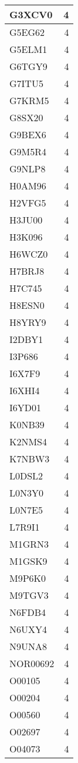 \documentclass[
]{book}
\theoremstyle{definition}
\theoremstyle{definition}
\theoremstyle{definition}
\theoremstyle{definition}
\theoremstyle{remark}
\begin{document}
\begin{table}
\begin{tabular}{l|r}
\hline
G3XCV0 & 4\\
\hline
G5EG62 & 4\\
\hline
G5ELM1 & 4\\
\hline
G6TGY9 & 4\\
\hline
G7ITU5 & 4\\
\hline
G7KRM5 & 4\\
\hline
G8SX20 & 4\\
\hline
G9BEX6 & 4\\
\hline
G9M5R4 & 4\\
\hline
G9NLP8 & 4\\
\hline
H0AM96 & 4\\
\hline
H2VFG5 & 4\\
\hline
H3JU00 & 4\\
\hline
H3K096 & 4\\
\hline
H6WCZ0 & 4\\
\hline
H7BRJ8 & 4\\
\hline
H7C745 & 4\\
\hline
H8ESN0 & 4\\
\hline
H8YRY9 & 4\\
\hline
I2DBY1 & 4\\
\hline
I3P686 & 4\\
\hline
I6X7F9 & 4\\
\hline
I6XHI4 & 4\\
\hline
I6YD01 & 4\\
\hline
K0NB39 & 4\\
\hline
K2NMS4 & 4\\
\hline
K7NBW3 & 4\\
\hline
L0DSL2 & 4\\
\hline
L0N3Y0 & 4\\
\hline
L0N7E5 & 4\\
\hline
L7R9I1 & 4\\
\hline
M1GRN3 & 4\\
\hline
M1GSK9 & 4\\
\hline
M9P6K0 & 4\\
\hline
M9TGV3 & 4\\
\hline
N6FDB4 & 4\\
\hline
N6UXY4 & 4\\
\hline
N9UNA8 & 4\\
\hline
NOR00692 & 4\\
\hline
O00105 & 4\\
\hline
O00204 & 4\\
\hline
O00560 & 4\\
\hline
O02697 & 4\\
\hline
O04073 & 4\\

\end{tabular}
\end{table}
\end{document}
